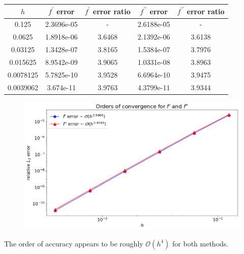 \documentclass[12pt]{article}
\begin{document}
\begin{center}
	\begin{tabular}{|c|c|c|c|c|}
		\hline
		$h$&$f^\prime$ error &$f^\prime$ error ratio&$f^{\prime\prime}$ error&$f^{\prime\prime}$ error ratio\\ \hline
		0.125&2.3696e-05&-&2.6188e-05&-\\ \hline
		0.0625&1.8918e-06&3.6468&2.1392e-06&3.6138\\ \hline
		0.03125&1.3428e-07&3.8165&1.5384e-07&3.7976\\ \hline
		0.015625&8.9542e-09&3.9065&1.0331e-08&3.8963\\ \hline
		0.0078125&5.7825e-10&3.9528&6.6964e-10&3.9475\\ \hline
		0.0039062&3.674e-11&3.9763&4.3799e-11&3.9344\\ \hline
	\end{tabular}
\end{center}

\begin{figure}[H]
	\includegraphics[width=.9\textwidth]{hw1_p3b_order_plot}
	\centering
\end{figure}

The order of accuracy appears to be roughly $\mathcal{O}(h^{4})$ for both methods.
\bigbreak
\end{document}
